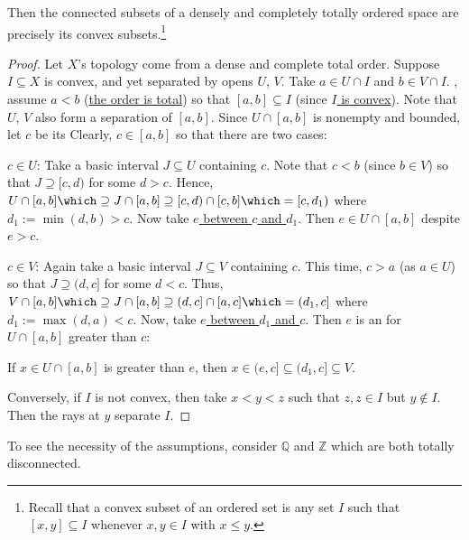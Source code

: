 	\begin{prp}\label{PRP: linear continua are connected}
		Then the connected subsets of a densely and completely totally ordered space are precisely its convex subsets.\footnote{Recall that a convex subset of an ordered set is any set $I$ such that $[x, y]\subseteq I$ whenever $x, y\in I$ with $x\le y$.}
	\end{prp}
	
	\begin{proof}
		Let $X$'s topology come from a dense and complete total order. Suppose $I\subseteq X$ is convex, and yet separated by opens $U$, $V$. Take $a\in U\cap I$ and $b\in V\cap I$. \Wlogg, assume $a < b$ (\uline{the order is total}) so that $[a, b]\subseteq I$ (since \uline{$I$ is convex}). Note that $U$, $V$ also form a separation of $[a, b]$. Since $U\cap [a, b]$ is nonempty and bounded, let $c$ be its \uline{\lub} Clearly, $c\in[a, b]$ so that there are two cases:
		\begin{mylist}
			\item[$c\in U$:] Take a basic interval $J\subseteq U$ containing $c$. Note that $c < b$ (since $b\in V$) so that $J\supseteq [c, d)$ for some $d > c$. Hence, $U\cap [a, b]\which\supseteq J\cap [a, b]\supseteq[c, d)\cap[c, b] \which= [c, d_1)$ where $d_1 :=  \min(d, b) > c$. Now take \uline{$e$ between $c$ and $d_1$}. Then $e\in U\cap[a, b]$ despite $e > c$.
			
			\item[$c\in V$:] Again take a basic interval $J\subseteq V$ containing $c$. This time, $c > a$ (as $a\in U$) so that $J\supseteq (d, c]$ for some $d < c$. Thus, $V\cap[a, b]\which\supseteq J\cap[a, b]\supseteq (d, c]\cap [a, c]\which=(d_1, c]$ where $d_1 := \max(d, a) < c$. Now, take \uline{$e$ between $d_1$ and $c$}. Then $e$ is an \ub for $U\cap[a, b]$ greater than $c$:
			\begin{subproof}
				If $x\in U\cap[a, b]$ is greater than $e$, then $x\in (e, c]\subseteq(d_1, c]\subseteq V$.
			\end{subproof}
		\end{mylist}
		
		Conversely, if $I$ is not convex, then take $x < y < z$ such that $z, z\in I$ but $y\notin I$. Then the rays at $y$ separate $I$.
	\end{proof}
	
	\begin{rmk}
		To see the necessity of the assumptions, consider $\mathbb Q$ and $\mathbb Z$ \resp which are both totally disconnected.
	\end{rmk}
	
